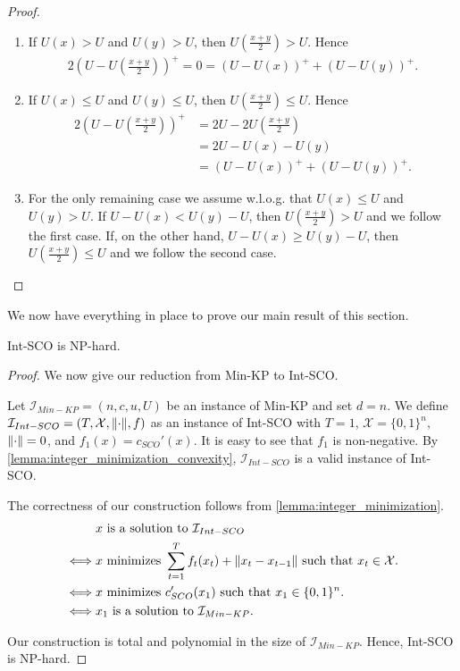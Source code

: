 \begin{proof}
\begin{enumerate}
    \item If $U(x) > U$ and $U(y) > U$, then $U\left(\frac{x+y}{2}\right) > U$. Hence \begin{align*}
        2\left(U - U\left(\frac{x+y}{2}\right)\right)^+ = 0 = (U - U(x))^+ + (U - U(y))^+.
    \end{align*}
    \item If $U(x) \leq U$ and $U(y) \leq U$, then $U\left(\frac{x+y}{2}\right) \leq U$. Hence \begin{align*}
        2\left(U - U\left(\frac{x+y}{2}\right)\right)^+ &= 2U - 2U\left(\frac{x+y}{2}\right) \\
                                                        &= 2U - U(x) - U(y) \\
                                                        &= (U - U(x))^+ + (U - U(y))^+.
    \end{align*}
    \item For the only remaining case we assume w.l.o.g. that $U(x) \leq U$ and $U(y) > U$. If $U - U(x) < U(y) - U$, then $U\left(\frac{x+y}{2}\right) > U$ and we follow the first case. If, on the other hand, $U - U(x) \geq U(y) - U$, then $U\left(\frac{x+y}{2}\right) \leq U$ and we follow the second case.\qedhere
\end{enumerate}
\end{proof}

We now have everything in place to prove our main result of this section.

\begin{theorem}
Int-SCO is NP-hard.
\end{theorem}
\begin{proof}
We now give our reduction from Min-KP to Int-SCO.

Let $\mathcal{I}_{Min-KP} = (n, c, u, U)$ be an instance of Min-KP and set $d = n$. We define $\mathcal{I}_{Int-SCO} = (T, \mathcal{X}, \lVert\cdot\rVert, f)$ as an instance of Int-SCO with $T = 1$, $\mathcal{X} = \{0,1\}^n$, $\lVert\cdot\rVert = 0$, and $f_1(x) = c_{SCO}'(x)$. It is easy to see that $f_1$ is non-negative. By \autoref{lemma:integer_minimization_convexity}, $\mathcal{I}_{Int-SCO}$ is a valid instance of Int-SCO.

The correctness of our construction follows from \autoref{lemma:integer_minimization}. \begin{align*}
         &x \text{ is a solution to } \mathcal{I}_{Int-SCO} \\
    \iff &x \text{ minimizes } \sum_{t=1}^T f_t(x_t) + \lVert x_t - x_{t-1}\rVert \text{ such that } x_t \in \mathcal{X}. \\
    \iff &x \text{ minimizes } c_{SCO}'(x_1) \text{ such that } x_1 \in \{0,1\}^n. \\
    \iff &x_1 \text{ is a solution to } \mathcal{I}_{Min-KP}.
\end{align*}

Our construction is total and polynomial in the size of $\mathcal{I}_{Min-KP}$. Hence, Int-SCO is NP-hard.
\end{proof}

